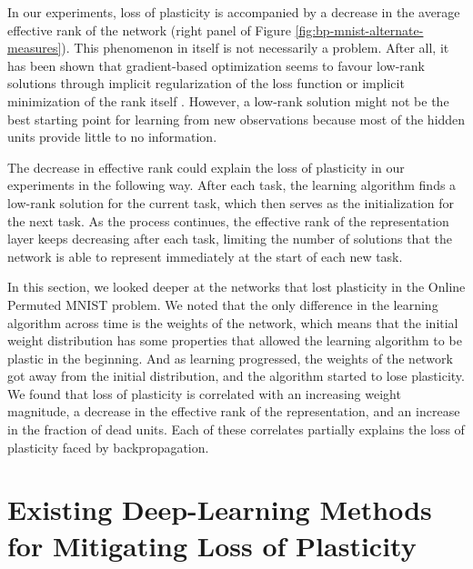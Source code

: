 \documentclass[review, number,3p]{elsarticle}
\begin{document}
In our experiments, loss of plasticity is accompanied by a decrease in the average effective rank of the network (right panel of Figure \ref{fig:bp-mnist-alternate-measures}).
This phenomenon in itself is not necessarily a problem.
After all, it has been shown that gradient-based optimization seems to favour low-rank solutions through implicit regularization of the loss function or implicit minimization of the rank itself \cite{smith2021on, 2020Razim}.
However, a low-rank solution might not be the best starting point for learning from new observations because most of the hidden units provide little to no information.

The decrease in effective rank could explain the loss of plasticity in our experiments in the following way.
After each task, the learning algorithm finds a low-rank solution for the current task, which then serves as the initialization for the next task.
As the process continues, the effective rank of the representation layer keeps decreasing after each task, limiting the number of solutions that the network is able to represent immediately at the start of each new task.

In this section, we looked deeper at the networks that lost plasticity in the Online Permuted MNIST problem. 
We noted that the only difference in the learning algorithm across time is the weights of the network, which means that the initial weight distribution has some properties that allowed the learning algorithm to be plastic in the beginning.
And as learning progressed, the weights of the network got away from the initial distribution, and the algorithm started to lose plasticity.
We found that loss of plasticity is correlated with an increasing weight magnitude, a decrease in the effective rank of the representation, and an increase in the fraction of dead units.
Each of these correlates partially explains the loss of plasticity faced by backpropagation.


\section{Existing Deep-Learning Methods for Mitigating Loss of Plasticity}
\end{document}
